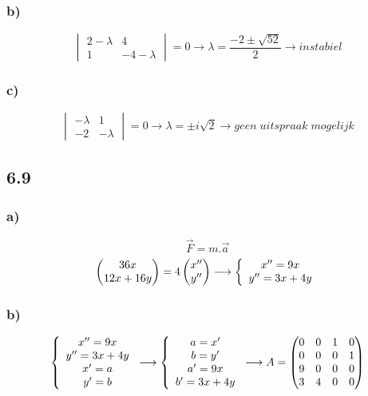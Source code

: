 \documentclass[11pt]{article}
\begin{document}
\subsubsection*{b)}
\[
\begin{vmatrix}
2-\lambda & 4\\
1 & -4-\lambda
\end{vmatrix}
=0
\longrightarrow
\lambda = \frac{-2 \pm \sqrt{52}}{2}
\longrightarrow
instabiel
\]

\subsubsection*{c)}
\[
\begin{vmatrix}
-\lambda & 1\\
-2 & -\lambda
\end{vmatrix}
=0
\longrightarrow
\lambda = \pm i\sqrt{2}
\longrightarrow
geen\;uitspraak\;mogelijk
\]

\subsection*{6.9}
\subsubsection*{a)}
\[
\vec{F}=m.\vec{a}
\]
\[
\begin{pmatrix}
36x\\12x+16y
\end{pmatrix}
=
4
\begin{pmatrix}
x''\\y''
\end{pmatrix}
\longrightarrow
\left\lbrace
\begin{array}{c c}
x''=9x\\y''=3x+4y
\end{array}
\right.
\]

\subsubsection*{b)}
\[
\left\lbrace
\begin{array}{c c}
x''=9x\\
y''=3x+4y\\
x' = a\\
y' = b
\end{array}
\right.
\longrightarrow
\left\lbrace
\begin{array}{c c}
a=x'\\
b=y'\\
a' = 9x\\
b' = 3x+4y
\end{array}
\right.
\longrightarrow
A=
\begin{pmatrix}
0 & 0 & 1 & 0\\
0 & 0 & 0 & 1\\
9 & 0 & 0 & 0\\
3 & 4 & 0 & 0\\
\end{pmatrix}
\]
\end{document}
